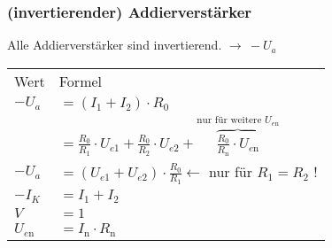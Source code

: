     \subsubsection{(invertierender) Addierverstärker}
        \begin{minipage}{0.6\columnwidth}
            Alle Addierverstärker sind invertierend. $\longrightarrow\ -U_a$
            \renewcommand{\arraystretch}{1.1}
            \begin{table}[H]
                \begin{tabularx}{\columnwidth}{l l}
                    Wert            & Formel \\
                    \vspace{-2ex} %
                    $-U_a$          & $=(I_1+I_2)\cdot R_0$\\
                                    & $=\frac{R_0}{R_1}\cdot U_{e1}+\frac{R_0}{R_2}\cdot U_{e2}+\overbrace{\frac{R_0}{R_\text{n}}\cdot U_{e\text{n}}}^{\text{nur für weitere }U_{e\text{n}}}$ \\
                    $-U_a$          & $=(U_{e1}+U_{e2})\cdot\frac{R_0}{R_1}\leftarrow$ nur für $R_1=R_2$ !\\
                    $-I_K$          & $=I_1+I_2$\\
                    $V$             & $=1$ \\
                    $U_{e\text{n}}$ & $=I_\text{n}\cdot R_\text{n}$ \\
                \end{tabularx}
            \end{table}
        \end{minipage}
        \begin{minipage}{0.4\columnwidth}
        \end{minipage}
